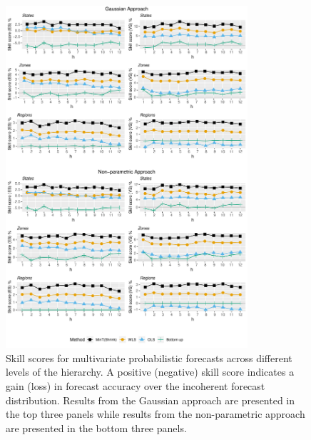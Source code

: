 \documentclass[12pt]{article}
\theoremstyle{definition}
\begin{document}
\begin{figure}
	\centering
	\small
	\includegraphics[width= 0.8\textwidth, height= 0.85\textheight]{Empirical-results/Levels_MultiVScores_ARIMA.pdf}
	\caption{Skill scores for multivariate probabilistic forecasts across different levels of the hierarchy. A positive (negative) skill score indicates a gain (loss) in forecast accuracy over the incoherent forecast distribution. Results from the Gaussian approach are presented in the top three panels while results from the non-parametric approach are presented in the bottom three panels.}\label{fig:EmpResults_Levels}
\end{figure}
\end{document}
